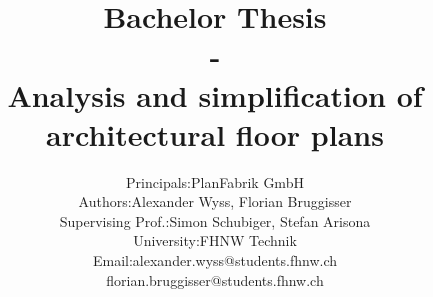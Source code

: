 \documentclass[11pt, a4paper]{report}
\begin{document}
	\title{\textbf{Bachelor Thesis \\ - \\Analysis and simplification of architectural floor plans}}
	\author{
			\begin{tabular}{l  l}
				Principals: & PlanFabrik GmbH \\
				Authors: & Alexander Wyss, Florian Bruggisser \\
				Supervising Prof.: & Simon Schubiger, Stefan Arisona \\ University: & FHNW Technik \\
				Email: & alexander.wyss@students.fhnw.ch \\ & florian.bruggisser@students.fhnw.ch				
			\end{tabular}
	}
	
	\maketitle
	\tableofcontents
	
	
	
	
	
	
	
	
	
	
\end{document}
